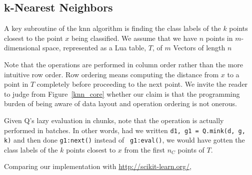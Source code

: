 \subsection{k-Nearest Neighbors}
\label{knn}

A key subroutine of the knn algorithm \cite{Hastie2009} is finding the class labels of the
\(k\) points closest to the point \(x\) being classified. 
We assume that we have \(n\) points in \(m\)-dimensional space, represented as a
Lua table, \(T\), of \(m\) Vectors of length \(n\)

Note that the operations are performed in column
order rather than the more intuitive row order. Row ordering means computing the
distance from \(x\) to a point in \(T\) completely before proceeding to the next
point. We invite the reader to judge from Figure~\ref{knn_core} whether 
our claim is that the programming burden of being aware of data layout and
operation ordering is not onerous.

Given Q's lazy evaluation in chunks, note that the operation is actually
performed in batches. In other words, had we written 
{\tt d1, g1 = Q.mink(d, g, k)} and then done {\tt g1:next()} instead  of {\tt
g1:eval()}, 
we would have gotten the class labels of the \(k\) points
closest to \(x\) from the first \(n_C\) points of \(T\). 


Comparing our implementation with \url{http://scikit-learn.org/}, \TBC

\begin{figure}[hbtp]
\centering
{}
\end{figure}


